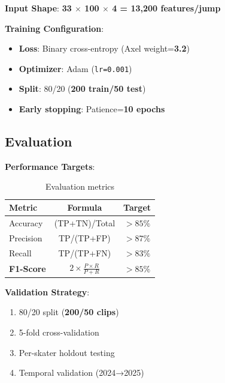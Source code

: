 \textbf{Input Shape}: \textbf{33 $\times$ 100 $\times$ 4 = 13,200 features/jump}

\textbf{Training Configuration}:
\begin{itemize}
\item \textbf{Loss}: Binary cross-entropy (Axel weight=\textbf{3.2})
\item \textbf{Optimizer}: Adam (\texttt{lr=0.001})
\item \textbf{Split}: 80/20 (\textbf{200 train/50 test})
\item \textbf{Early stopping}: Patience=\textbf{10 epochs}
\end{itemize}

\subsection{Evaluation}

\textbf{Performance Targets}:

\begin{table}[htbp]
\centering
\begin{tabular}{|l|c|c|}
\hline
\textbf{Metric} & \textbf{Formula} & \textbf{Target} \\
\hline
Accuracy & (TP+TN)/Total & $>85\%$ \\
Precision & TP/(TP+FP) & $>87\%$ \\
Recall & TP/(TP+FN) & $>83\%$ \\
\textbf{F1-Score} & $2\times\frac{P\times R}{P+R}$ & \textbf{$>85\%$} \\
\hline
\end{tabular}
\caption{Evaluation metrics}
\label{tab:metrics}
\end{table}

\textbf{Validation Strategy}:
\begin{enumerate}
\item 80/20 split (\textbf{200/50 clips})
\item 5-fold cross-validation
\item Per-skater holdout testing
\item Temporal validation (2024→2025)
\end{enumerate}

